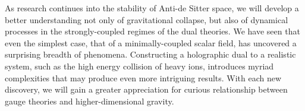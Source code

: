 \documentclass[../PhD.tex]{subfiles}
\begin{document}
As research continues into the stability of Anti-de Sitter space, we will develop a better understanding not only of gravitational collapse, but also of dynamical processes in the strongly-coupled regimes of the dual theories. We have seen that even the simplest case, that of a minimally-coupled scalar field, has uncovered a surprising breadth of phenomena. Constructing a holographic dual to a realistic system, such as the high energy collision of heavy ions, introduces myriad complexities that may produce even more intriguing results. With each new discovery, we will gain a greater appreciation for curious relationship between gauge theories and higher-dimensional gravity.























\end{document}
